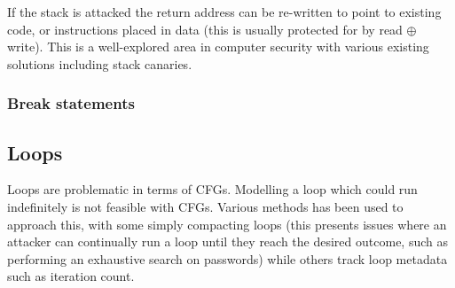 If the stack is attacked the return address can be re-written to point to existing code, or instructions placed in data (this is usually protected for by read $\oplus$ write). This is a well-explored area in computer security with various existing solutions including stack canaries.

\subsubsection{Break statements}


\subsection{Loops}
Loops are problematic in terms of CFGs. Modelling a loop which could run indefinitely is not feasible with CFGs. Various methods has been used to approach this, with some \cite{Abadi2005} simply compacting loops (this presents issues where an attacker can continually run a loop until they reach the desired outcome, such as performing an exhaustive search on passwords) while others \cite{Dessouky2017} track loop metadata such as iteration count.